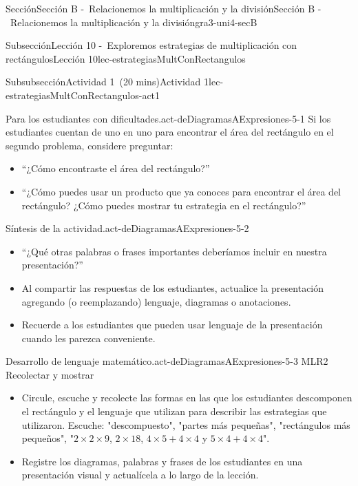 \documentclass[oneside,10pt,]{article}
\begin{document}
\begin{sectionptx}{Sección}{Sección B -~Relacionemos la multiplicación y la división}{}{Sección B -~Relacionemos la multiplicación y la división}{}{}{gra3-uni4-secB}
\begin{subsectionptx}{Subsección}{Lección 10 -~Exploremos estrategias de multiplicación con rectángulos}{}{Lección 10}{}{}{lec-estrategiasMultConRectangulos}
\begin{subsubsectionptx}{Subsubsección}{Actividad 1~(20 mins)}{}{Actividad 1}{}{}{lec-estrategiasMultConRectangulos-act1}
\par
\begin{paragraphs}{Para los estudiantes con dificultades.}{act-deDiagramasAExpresiones-5-1}%
Si los estudiantes cuentan de uno en uno para encontrar el área del rectángulo en el segundo problema, considere preguntar:%
%
\begin{itemize}[label=\textbullet]
\item{}``¿Cómo encontraste el área del rectángulo?''%
\item{}``¿Cómo puedes usar un producto que ya conoces para encontrar el área del rectángulo? ¿Cómo puedes mostrar tu estrategia en el rectángulo?''%
\end{itemize}
\end{paragraphs}%
\begin{paragraphs}{Síntesis de la actividad.}{act-deDiagramasAExpresiones-5-2}%
%
\begin{itemize}[label=\textbullet]
\item{}``¿Qué otras palabras o frases importantes deberíamos incluir en nuestra presentación?''%
\item{}Al compartir las respuestas de los estudiantes, actualice la presentación agregando (o reemplazando) lenguaje, diagramas o anotaciones.%
\item{}Recuerde a los estudiantes que pueden usar lenguaje de la presentación cuando les parezca conveniente.%
\end{itemize}
\end{paragraphs}%
\begin{paragraphs}{Desarrollo de lenguaje matemático.}{act-deDiagramasAExpresiones-5-3}%
MLR2 Recolectar y mostrar%
%
\begin{itemize}[label=\textbullet]
\item{}Circule, escuche y recolecte las formas en las que los estudiantes descomponen el rectángulo y el lenguaje que utilizan para describir las estrategias que utilizaron. Escuche: "descompuesto", "partes más pequeñas", "rectángulos más pequeños", "\(2 \times 2 \times 9\), \(2 \times 18\), \(4 \times 5 + 4 \times 4\) y \(5 \times 4 + 4 \times 4\)".%
\item{}Registre los diagramas, palabras y frases de los estudiantes en una presentación visual y actualícela a lo largo de la lección.%
\end{itemize}
\end{paragraphs}%
\end{subsubsectionptx}
%
%
\typeout{************************************************}

\end{subsectionptx}
\end{sectionptx}
\end{document}
